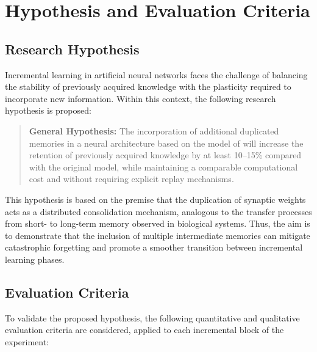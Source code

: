 \section{Hypothesis and Evaluation Criteria}

\subsection{Research Hypothesis}

Incremental learning in artificial neural networks faces the challenge of balancing the stability of previously acquired knowledge with the plasticity required to incorporate new information. Within this context, the following research hypothesis is proposed:

\begin{quote}
    \textbf{General Hypothesis:} 
    The incorporation of additional duplicated memories in a neural architecture based on the model of \cite{bullinaria2009} will increase the retention of previously acquired knowledge by at least 10--15\% compared with the original model, while maintaining a comparable computational cost and without requiring explicit replay mechanisms.
\end{quote}

This hypothesis is based on the premise that the duplication of synaptic weights acts as a distributed consolidation mechanism, analogous to the transfer processes from short- to long-term memory observed in biological systems.  
Thus, the aim is to demonstrate that the inclusion of multiple intermediate memories can mitigate catastrophic forgetting and promote a smoother transition between incremental learning phases.

\subsection{Evaluation Criteria} \label{sec:criterios_eval}

To validate the proposed hypothesis, the following quantitative and qualitative evaluation criteria are considered, applied to each incremental block of the experiment:

